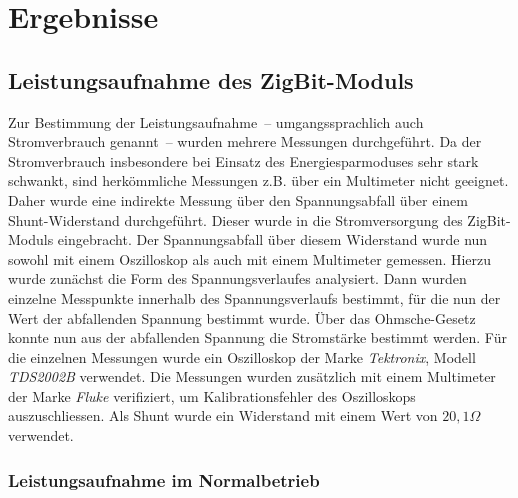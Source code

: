 


\chapter{Ergebnisse}
\section{Leistungsaufnahme des ZigBit-Moduls}
\label{ergebnis_normal}
Zur Bestimmung der Leistungsaufnahme~-- umgangssprachlich auch Strom\-ver\-brauch genannt~-- wurden mehrere Messungen durchgeführt.
Da der Stromverbrauch insbesondere bei Einsatz des Energiesparmoduses sehr stark schwankt, sind herkömmliche Messungen
z.B. über ein Multimeter nicht geeignet. Daher wurde eine indirekte Messung über den Spannungsabfall über einem 
Shunt-Wi\-der\-stand durchgeführt. Dieser wurde in die Stromversorgung des ZigBit-Moduls eingebracht. Der Spannungsabfall
über diesem Widerstand wurde nun sowohl mit einem Oszilloskop als auch mit einem Multimeter gemessen. Hierzu wurde zunächst
die Form des Spannungsverlaufes analysiert. Dann wurden einzelne Messpunkte innerhalb des Spannungsverlaufs bestimmt,
für die nun der Wert der abfallenden Spannung bestimmt wurde. Über das Ohmsche-Gesetz konnte nun aus der abfallenden
Spannung die Stromstärke bestimmt werden. Für die einzelnen Messungen wurde ein Oszilloskop der Marke \emph{Tektronix}, 
Modell \emph{TDS2002B} verwendet. Die Messungen wurden zusätzlich mit einem Multimeter der Marke \emph{Fluke} verifiziert,
um Kalibrationsfehler des Oszilloskops auszuschliessen. Als Shunt wurde ein Widerstand mit einem Wert von $20,1\Omega$
verwendet.

\subsection{Leistungsaufnahme im Normalbetrieb}

